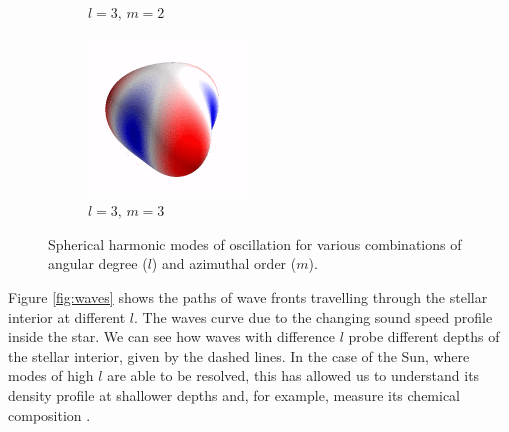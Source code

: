 \begin{figure}[ht]
\begin{subfigure}[b]{0.2\linewidth}
        \caption*{$l=3,\,m=2$}
    \end{subfigure}%
    \begin{subfigure}[b]{0.2\linewidth}
        \includegraphics[width=\linewidth]{introduction/images/3_3.png}
        \caption*{$l=3,\,m=3$}
    \end{subfigure}
    \caption{Spherical harmonic modes of oscillation for various combinations of angular degree ($l$) and azimuthal order ($m$).}
    \label{fig:modes}
\end{figure}

Figure \ref{fig:waves} shows the paths of wave fronts travelling through the stellar interior at different $l$. The waves curve due to the changing sound speed profile inside the star. We can see how waves with difference $l$ probe different depths of the stellar interior, given by the dashed lines. In the case of the Sun, where modes of high $l$ are able to be resolved, this has allowed us to understand its density profile at shallower depths and, for example, measure its chemical composition \citep{Basu.Antia2004}.

